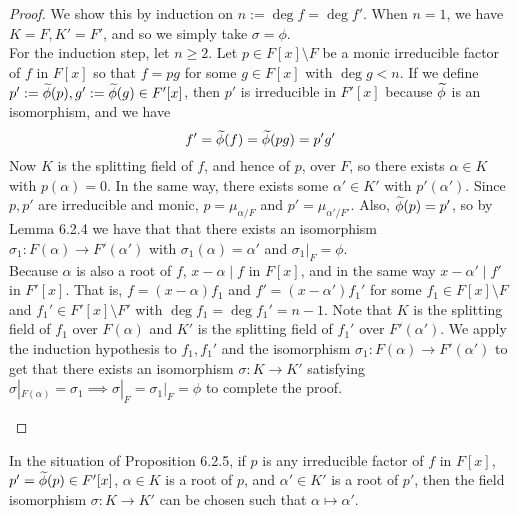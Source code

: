 \documentclass[11pt]{book}
\theoremstyle{definition}   \newtheorem{defn}[counter]{Definition} %
\newcommand{\bs}{\setminus}   \newcommand{\A}{\mathcal{A}}   \newcommand{\sy}{\textnormal{Syl}}   \newcommand{\size}[1]{\left| #1 \right|}
\DeclareMathOperator{\ra}{\rightarrow}   \DeclareMathOperator{\Poly}{\mathbf{P}}   \DeclareMathOperator{\spn}{\textnormal{span}}   \DeclareMathOperator{\aut}{\textnormal{Aut}}
\newcommand{\vs}{\vspace{8pt}}
\numberwithin{counter}{chapter}
\begin{document}
\begin{proof}
We show this by induction on $n := \deg f = \deg f'$. When $n = 1$, we have $K = F, K' = F'$, and so we simply take $\sigma = \phi$. \\

For the induction step, let $n \geq 2$. Let $p \in F[x] \bs F$ be a monic irreducible factor of $f$ in $F[x]$ so that $f = pg$ for some $g \in F[x]$ with $\deg g < n$. If we define $p' := \widetilde{\phi}(p), g' := \widetilde{\phi}(g) \in F'[x]$, then $p'$ is irreducible in $F'[x]$ because $\widetilde{\phi}$ is an isomorphism, and we have
	\[f' = \widetilde{\phi}(f) = \widetilde{\phi}(pg) = p' g' \]
Now $K$ is the splitting field of $f$, and hence of $p$, over $F$, so there exists $\alpha \in K$ with $p(\alpha) = 0$. In the same way, there exists some $\alpha' \in K'$ with $p'(\alpha')$. Since $p,p'$ are irreducible and monic, $p = \mu_{\alpha/F}$ and $p' = \mu_{\alpha'/F'}$. Also, $\widetilde{\phi}(p) = p'$, so by Lemma 6.2.4 we have that that there exists an isomorphism $\sigma_1 : F(\alpha) \ra F'(\alpha')$ with $\sigma_1(\alpha) = \alpha'$ and $\sigma_1|_F = \phi$. \\

Because $\alpha$ is also a root of $f$, $x-\alpha \mid f$ in $F[x]$, and in the same way $x-\alpha' \mid f'$ in $F'[x]$. That is, $f = (x-\alpha) f_1$ and $f' = (x-\alpha') f_1'$ for some $f_1 \in F[x] \bs F$ and $f_1' \in F'[x] \bs F'$ with $\deg f_1 = \deg f_1' = n-1$. Note that $K$ is the splitting field of $f_1$ over $F(\alpha)$ and $K'$ is the splitting field of $f_1'$ over $F'(\alpha')$. We apply the induction hypothesis to $f_1,f_1'$ and the isomorphism $\sigma_1 : F(\alpha) \ra F'(\alpha')$ to get that there exists an isomorphism $\sigma : K \ra K'$ satisfying $\sigma|_{F(\alpha)} = \sigma_1 \implies \sigma|_F = \sigma_1|_F = \phi$ to complete the proof. 
\begin{center}
\end{center}
\end{proof}

\vs

\begin{corollary}
In the situation of Proposition 6.2.5, if $p$ is any irreducible factor of $f$ in $F[x]$, $p' = \widetilde{\phi}(p) \in F'[x]$, $\alpha \in K$ is a root of $p$, and $\alpha' \in K'$ is a root of $p'$, then the field isomorphism $\sigma : K \ra K'$ can be chosen such that $\alpha \mapsto \alpha'$. 
\end{corollary}
\end{document}
